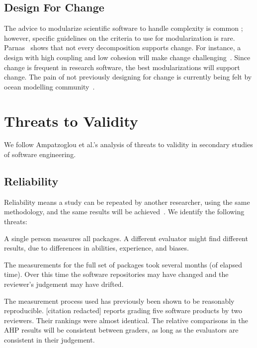 \documentclass[doubleblind,12pt, 3p, times]{elsarticle}
\begin{document}
\subsection{Design For Change} \label{Sec_DesForChange}

The advice to modularize scientific software to handle complexity is common
\cite{WilsonEtAl2014, StewartEtAl2017, Storer2017}; however, specific guidelines
on the criteria to use for modularization is rare.  Parnas~\cite{Parnas1972a}
shows that not every decomposition supports change.  For instance, a design with
high coupling and low cohesion will make change challenging~\cite[p.\
48]{GhezziEtAl2003}. Since change is frequent in research software, the best
modularizations will support change. The pain of not previously designing for
change is currently being felt by ocean modelling community~\cite{JungEtAl2022}.

\section{Threats to Validity} \label{sec_threats_to_validity}

We follow Ampatzoglou et al.'s \cite{AmpatzoglouEtAl2019} analysis of
threats to validity in secondary studies of software engineering.

\subsection{Reliability}

Reliability means a study can be repeated by another researcher, using the same
methodology, and the same results will be achieved~\cite{RunesonAndHost2009}.
We identify the following threats:
\begin{enumerate*}
\item A single person measures all packages. A different evaluator might find
different results, due to differences in abilities, experience, and biases.
\item The measurements for the full set of packages took several months (of
elapsed time).  Over this time the software repositories may have changed and
the reviewer's judgement may have drifted.
\end{enumerate*}

The measurement process used has previously been shown to be reasonably
reproducible.
[citation redacted] reports grading five software products by two reviewers.
Their rankings were almost identical. The relative comparisons in the AHP
results will be consistent between graders, as long as the evaluators are
consistent in their judgement.
\end{document}
